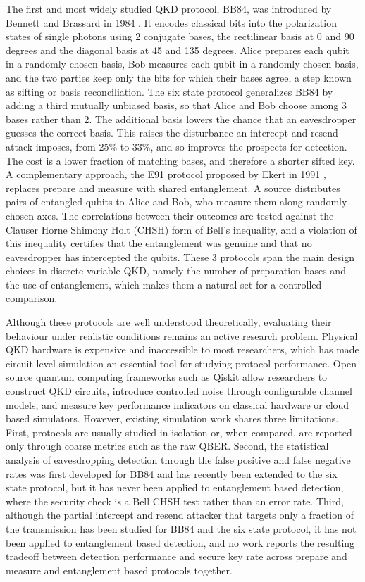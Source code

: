 \documentclass[conference]{IEEEtran}
\begin{document}
The first and most widely studied QKD protocol, BB84, was introduced by Bennett
and Brassard in 1984 \cite{bennett1984quantum}. It encodes classical bits into
the polarization states of single photons using 2 conjugate bases, the
rectilinear basis at 0 and 90 degrees and the diagonal basis at 45
and 135 degrees. Alice prepares each qubit in a
randomly chosen basis, Bob measures each qubit in a randomly chosen basis, and
the two parties keep only the bits for which their bases agree, a step known as
sifting or basis reconciliation. The six state protocol generalizes BB84 by
adding a third mutually unbiased basis, so that Alice and Bob choose among
3 bases rather than 2. The additional basis lowers the chance that an
eavesdropper guesses the correct basis. This raises the disturbance an intercept
and resend attack imposes, from 25\% to 33\%, and
so improves the prospects for detection. The cost is a lower fraction of
matching bases, and therefore a shorter sifted key. A complementary
approach, the E91 protocol proposed by Ekert in 1991 \cite{ekert1991quantum},
replaces prepare and measure with shared entanglement. A source distributes
pairs of entangled qubits to Alice and Bob, who measure them along randomly
chosen axes. The correlations between their outcomes are tested against the
Clauser Horne Shimony Holt (CHSH) form of Bell's inequality, and a violation of
this inequality certifies that the entanglement was genuine and that no
eavesdropper has intercepted the qubits. These 3 protocols span the main
design choices in discrete variable QKD, namely the number of preparation bases
and the use of entanglement, which makes them a natural set for a controlled
comparison.

Although these protocols are well understood theoretically, evaluating their
behaviour under realistic conditions remains an active research problem.
Physical QKD hardware is expensive and inaccessible to most researchers, which
has made circuit level simulation an essential tool for studying protocol
performance. Open source quantum computing frameworks such as Qiskit allow
researchers to construct QKD circuits, introduce controlled noise through
configurable channel models, and measure key performance indicators on
classical hardware or cloud based simulators. However, existing simulation work
shares three limitations. First, protocols are usually studied in isolation or,
when compared, are reported only through coarse metrics such as the raw QBER.
Second, the statistical analysis of eavesdropping detection through the false
positive and false negative rates was first developed for BB84 and has recently
been extended to the six state protocol, but it has never been applied to
entanglement based detection, where the security check is a Bell CHSH test
rather than an error rate. Third, although the partial intercept and resend
attacker that targets only a fraction of the transmission has been studied for
BB84 and the six state protocol, it has not been applied to entanglement based
detection, and no work reports the resulting tradeoff between detection
performance and secure key rate across prepare and measure and entanglement
based protocols together.
\end{document}
